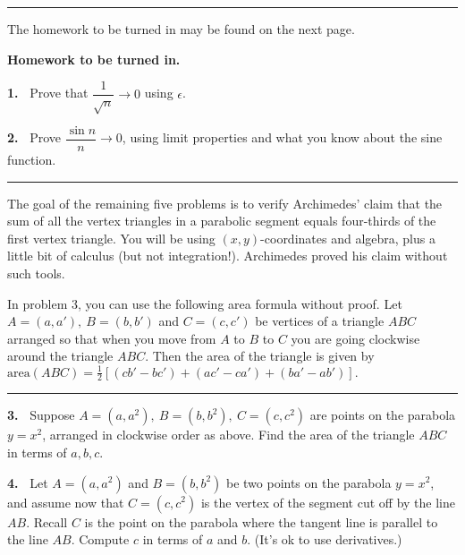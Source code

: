 \documentclass[12pt]{article}
\newcommand{\ep}{\epsilon}
\theoremstyle{definition}
\theoremstyle{remark}
\theoremstyle{definition}
\newenvironment{Solution}{\noindent\textbf{Solution.}}{}
\begin{document}
\rule{\textwidth}{1pt}
The homework to be turned in may be found on the next page.
\newpage

{\bf Homework to be turned in.}

{\bf 1.\ } Prove that $\dfrac{1}{\sqrt{n}}\to 0$ using $\ep$. 


\vskip10pt
{\bf 2.\ } Prove $\dfrac{\sin n}{n}\to 0$, using limit properties and what you know about the sine function. 


\rule{\textwidth}{1pt}
The goal of the remaining five problems is to verify Archimedes' claim that the sum of all the vertex triangles in a parabolic segment equals four-thirds of the first vertex triangle. You will be using $(x,y)$-coordinates and algebra, plus a little bit of calculus (but not integration!). Archimedes proved his claim without such tools. 

In problem 3, you can use the following area formula without proof. Let 
$A=(a,a'),\  B=(b,b')$ and $ C=(c,c')$
be vertices of a triangle $ABC$ arranged so that when you move from $A$ to $B$ to $C$ you are going clockwise around the triangle $ABC$. Then the area of the triangle is given by
$\text{area}(ABC)=\tfrac{1}{2}\left[(cb'-bc')+(ac'-ca')+(ba'-ab')\right].$\newline
\rule{\textwidth}{1pt}

{\bf 3.\ } Suppose $A=(a,a^2),\ B=(b,b^2),\ C=(c,c^2)$ are  points on the parabola $y=x^2$, arranged in clockwise order as above. 
Find the area of the triangle $ABC$ in terms of $a,b,c$. 


\vskip5pt
{\bf 4.\ }
Let $A=(a,a^2)$ and $B=(b,b^2)$ be two points on the parabola $y=x^2$, and assume now that  $C=(c,c^2)$ is the vertex of the segment cut off by the line $AB$. Recall $C$ is the point on the parabola where the tangent line is parallel to the line $AB$.
Compute $c$ in terms of $a$ and $b$. (It's ok to use derivatives.)
\end{document}
